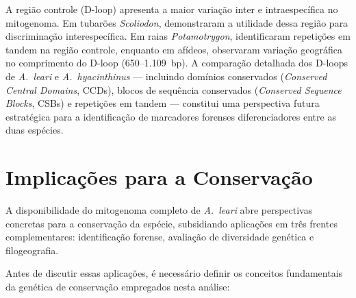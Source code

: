 A região controle (D-loop) apresenta a maior variação inter e intraespecífica no mitogenoma. Em tubarões \textit{Scoliodon},  demonstraram a utilidade dessa região para discriminação interespecífica. Em raias \textit{Potamotrygon},  identificaram repetições em tandem na região controle, enquanto em afídeos,  observaram variação geográfica no comprimento do D-loop (650--1.109~bp). A comparação detalhada dos D-loops de \textit{A.~leari} e \textit{A.~hyacinthinus} --- incluindo domínios conservados (\textit{Conserved Central Domains}, CCDs), blocos de sequência conservados (\textit{Conserved Sequence Blocks}, CSBs) e repetições em tandem --- constitui uma perspectiva futura estratégica para a identificação de marcadores forenses diferenciadores entre as duas espécies.


\section{Implicações para a Conservação}
\label{sec:implicacoes_conservacao}

A disponibilidade do mitogenoma completo de \textit{A.~leari} abre perspectivas concretas para a conservação da espécie, subsidiando aplicações em três frentes complementares: identificação forense, avaliação de diversidade genética e filogeografia.

Antes de discutir essas aplicações, é necessário definir os conceitos fundamentais da genética de conservação empregados nesta análise:


